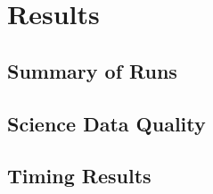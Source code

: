 
\section{Results}

\subsection{Summary of Runs}

\subsection{Science Data Quality}

\subsection{Timing Results}


